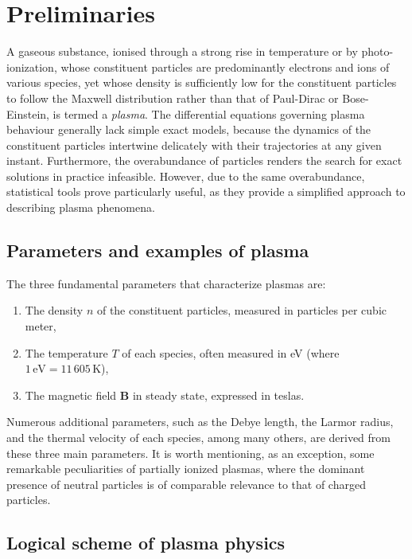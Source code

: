 \chapter{Preliminaries}

\label{fundamentals}


A gaseous substance, ionised through a strong rise in temperature or by photo-ionization, whose constituent particles are predominantly electrons and ions of various species, yet whose density is sufficiently low for the constituent particles to follow the Maxwell distribution rather than that of Paul-Dirac or Bose-Einstein, is termed a \textit{plasma}. The differential equations governing plasma behaviour generally lack simple exact models, because the dynamics of the constituent particles intertwine delicately with their trajectories at any given instant. Furthermore, the overabundance of particles renders the search for exact solutions in practice infeasible. However, due to the same overabundance, statistical tools prove particularly useful, as they provide a simplified approach to describing plasma phenomena.

\section{Parameters and examples of plasma}

The three fundamental parameters that characterize plasmas are:

\begin{enumerate}
    \item The density $n$ of the constituent particles, measured in particles per cubic meter,
    \item The temperature $T$ of each species, often measured in eV (where $1\,\text{eV}=11\,605\,\text{K}$),
    \item The magnetic field $\mathbf{B}$ in steady state, expressed in teslas.
\end{enumerate}

Numerous additional parameters, such as the Debye length, the Larmor radius, and the thermal velocity of each species, among many others, are derived from these three main parameters. It is worth mentioning, as an exception, some remarkable peculiarities of partially ionized plasmas, where the dominant presence of neutral particles is of comparable relevance to that of charged particles.

\section{Logical scheme of plasma physics}

